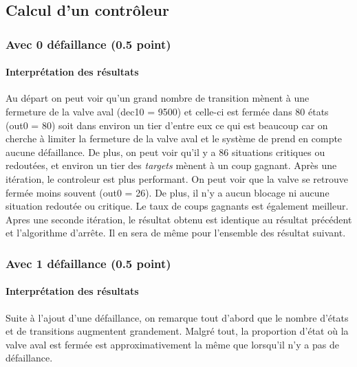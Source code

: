 \documentclass[a4paper]{book}
\begin{document}
\subsection{Calcul d'un contrôleur}
\subsubsection{Avec 0 défaillance (0.5 point)}



%
%
\paragraph{Interprétation des résultats}
Au départ on peut voir qu'un grand nombre de transition mènent à une fermeture de la valve aval (dec10 = 9500) et celle-ci est fermée dans 80 états (out0 = 80) soit dans environ un tier d'entre eux ce qui est beaucoup car on cherche à limiter la fermeture de la valve aval et le système de prend en compte aucune défaillance. De plus, on peut voir qu'il y a 86 situations critiques ou redoutées, et environ un tier des \textit{targets} mènent à un coup gagnant.
Après une itération, le controleur est plus performant. On peut voir que la valve se retrouve fermée moins souvent (out0 = 26). De plus, il n'y a aucun blocage ni aucune situation redoutée ou critique. Le taux de coups gagnants est également meilleur.
Apres une seconde itération, le résultat obtenu est identique au résultat précédent et l'algorithme d'arrête. Il en sera de même pour l'ensemble des résultat suivant.


\subsubsection{Avec 1 défaillance (0.5 point)}




%
\paragraph{Interprétation des résultats}
Suite à l'ajout d'une défaillance, on remarque tout d'abord que le nombre d'états et de transitions augmentent grandement. Malgré tout, la proportion d'état où la valve aval est fermée est approximativement la même que lorsqu'il n'y a pas de défaillance.
\end{document}
